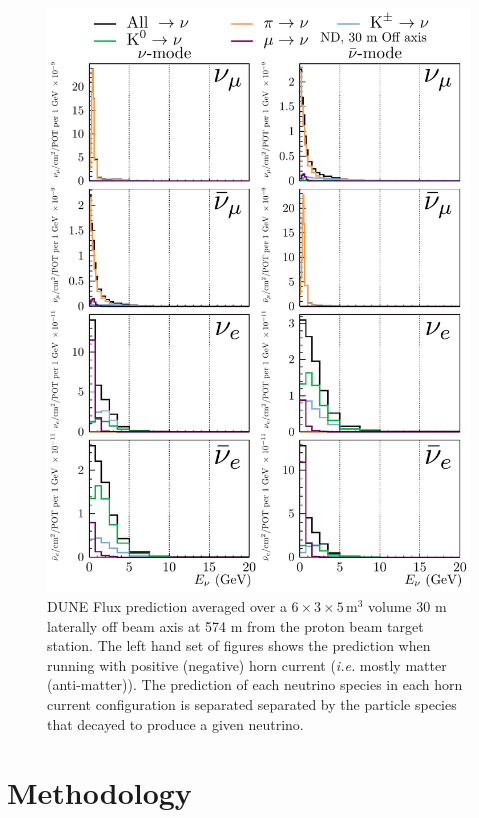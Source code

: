 \documentclass{article}
\begin{document}
\begin{figure}
  \includegraphics[width=\textwidth]{plots/fluxpredcompvar/ND_HadronParentFluxComponents_30m_offaxis}
  \caption{DUNE Flux prediction averaged over a $6\times 3\times 5\,\textrm{m}^{3}$ volume 30 m laterally off beam axis at 574 m from the proton beam target station. The left hand set of figures shows the prediction when running with positive (negative) horn current (\textit{i.e.} mostly matter (anti-matter)). The prediction of each neutrino species in each horn current configuration is separated separated by the particle species that decayed to produce a given neutrino.}
  \label{fig:flux_predictions__off_axis}
\end{figure}

\section{Methodology}
\end{document}
